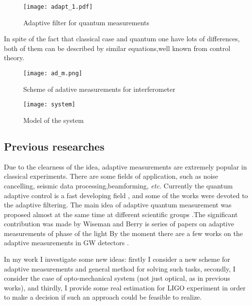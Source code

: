 \begin{figure}[!]
\begin{center}
 \texttt{[image: adapt\_1.pdf]}
 \caption{Adaptive filter for quantum measurements}
\label{pic:quantad}
\end{center}
\end{figure}
In spite of the fact that classical case and quantum one have lots of differences, both of them can be described by similar equations,well known from control theory.

\begin{figure}
\begin{minipage}[b]{0.6\linewidth}
\texttt{[image: ad\_m.png]}
\caption{Scheme of adative measurements for interferometer}
\end{minipage}
\hspace{0.1\linewidth}
\begin{minipage}[b]{0.3\linewidth}
 \texttt{[image: system]}
 \caption{Model of the system}
 \label{pic:sys}
\end{minipage}

\end{figure}
\subsection{Previous researches}
Due to the clearness of the idea, adaptive measurements are extremely popular in classical experiments. There are some fields of application, such as noise cancelling, seismic data processing,beamforming, \textit{etc.} \cite{Farhang-Boroujeny1998}
Currently the quantum adaptive control is a fast developing field \cite{Wiseman2011a,Ahn2008}, and some of the works were devoted to the adaptive filtering.
The main idea of adaptive quantum measurement was proposed almost at the same time at different scientific groups \cite{Wiseman1997,Braginsky1993}.The significant contribution was made by Wiseman and Berry is series of papers on adaptive measurements of phase of the light \cite{Berry2008,Berry2001,Berry2002,Measurements1995m}
By the moment there are a few works on the adaptive measurements in GW detectors \cite{Hentschel2010,Dhurandhar2008}.

In my work I investigate some new ideas: firstly I consider a new scheme for adaptive measurements and general method for solving such tasks, secondly, I consider the case of opto-mechanical system (not just optical, as in previous works), and thirdly, I provide some real estimation for LIGO experiment in order to make a decision if such an approach could be feasible to realize.
